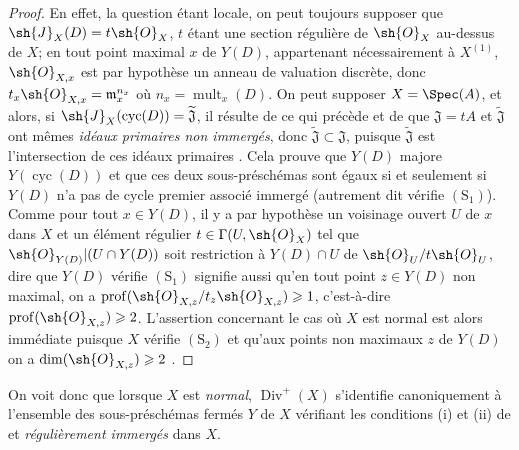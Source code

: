 \begin{proof}
En effet, la question étant locale, on peut toujours supposer que $\sh{J}_X(D)=t\sh{O}_X$, $t$ étant une section régulière de $\sh{O}_X$ au-dessus de $X$;
en tout point maximal $x$ de $Y(D)$, appartenant nécessairement à $X^{(1)}$, $\sh{O}_{X,x}$ est par hypothèse un anneau de valuation discrète, donc $t_x\sh{O}_{X,x}=\mathfrak{m}_x^{n_x}$ où $n_x=\operatorname{mult}_x(D)$.
On peut supposer $X=\Spec(A)$, et alors, si $\sh{J}_X(\operatorname{cyc}(D))=\widetilde{\mathfrak{J}}$, il résulte de ce qui précède et de  que $\mathfrak{J}=tA$ et $\widetilde{\mathfrak{J}}$ ont mêmes \emph{idéaux primaires non immergés}, donc $\widetilde{\mathfrak{J}}\subset\mathfrak{J}$, puisque $\widetilde{\mathfrak{J}}$ est l'intersection
de ces idéaux primaires .
Cela prouve que $Y(D)$ majore $Y(\operatorname{cyc}(D))$ et que ces deux sous-préschémas sont égaux si et seulement si $Y(D)$ n'a pas de cycle premier associé immergé (autrement dit vérifie $(\mathrm{S}_1)$).
Comme pour tout $x\in Y(D)$, il y a par hypothèse un voisinage ouvert $U$ de $x$ dans $X$ et un élément régulier $t\in\Gamma(U,\sh{O}_X)$ tel que $\sh{O}_{Y(D)}|(U\cap Y(D))$ soit restriction à $Y(D)\cap U$ de $\sh{O}_U/t\sh{O}_U$, dire que $Y(D)$ vérifie $(\mathrm{S}_1)$ signifie aussi qu'en tout point $z\in Y(D)$ non maximal, on a $\operatorname{prof}(\sh{O}_{X,z}/t_z\sh{O}_{X,z})\geq1$, c'est-à-dire  $\operatorname{prof}(\sh{O}_{X,z})\geq2$.
L'assertion concernant le cas où $X$ est normal est alors immédiate puisque $X$ vérifie $(\mathrm{S}_2)$ et qu'aux points non maximaux $z$ de $Y(D)$ on a $\dim(\sh{O}_{X,z})\geq2$ .
\end{proof}

\begin{env}[21.7.3.1]
\label{IV.21.7.3.1}
On voit donc que lorsque $X$ est \emph{normal}, $\operatorname{Div}^+(X)$ s'identifie canoniquement à l'ensemble des sous-préschémas fermés $Y$ de $X$ vérifiant les conditions (i) et (ii) de  et \emph{régulièrement immergés} dans $X$.
\end{env}

